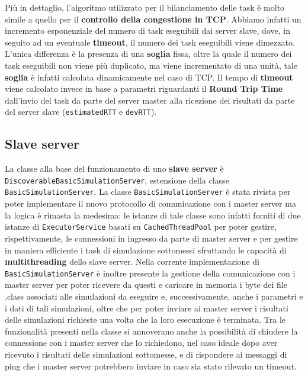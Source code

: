 Più in dettaglio, l'algoritmo utilizzato per il bilanciamento delle task è molto simile a quello per il \textbf{controllo della congestione in TCP}. Abbiamo infatti un incremento esponenziale del numero di task eseguibili dai server slave, dove, in seguito ad un eventuale \textbf{timeout}, il numero dei task eseguibili viene dimezzato. L'unica differenza è la presenza di una \textbf{soglia} fissa, oltre la quale il numero dei task eseguibili non viene più duplicato, ma viene incrementato di una unità, tale \textbf{soglia} è infatti calcolata dinamicamente nel caso di TCP. Il tempo di \textbf{timeout} viene calcolato invece in base a parametri riguardanti il \textbf{Round Trip Time} dall'invio del task da parte del server master alla ricezione dei risultati da parte del server slave (\texttt{estimatedRTT} e \texttt{devRTT}).

\subsection{Slave server}
La classe alla base del funzionamento di uno \textbf{slave server} è \texttt{DiscoverableBasicSimulationServer}, estensione della classe \texttt{BasicSimulationServer}.
La classe \texttt{BasicSimulationServer} è stata rivista per poter implementare il nuovo protocollo di comunicazione con i master server ma la logica è rimasta la medesima:
le istanze di tale classe sono infatti forniti di due istanze di \texttt{ExecutorService} basati su \texttt{CachedThreadPool} per poter gestire, rispettivamente, le connessioni in ingresso da parte di master server
e per gestire in maniera efficiente i task di simulazione sottomessi sfruttando le capacità di \textbf{multithreading} dello slave server.
Nella corrente implementazione di \texttt{BasicSimulationServer} è inoltre presente la gestione della comunicazione con i master server per poter ricevere da questi e caricare in memoria i byte dei file .class associati
alle simulazioni da eseguire e, successivamente, anche i parametri e i dati di tali simulazioni, oltre che per poter inviare ai master server i risultati delle simulazioni richieste una volta che la loro esecuzione è terminata.
Tra le funzionalità presenti nella classe si annoverano anche la possibilità di chiudere la connessione con i master server che lo richiedono, nel caso ideale dopo aver ricevuto i risultati delle simulazioni sottomesse,
e di rispondere ai messaggi di ping che i master server potrebbero inviare in caso sia stato rilevato un timeout. 

